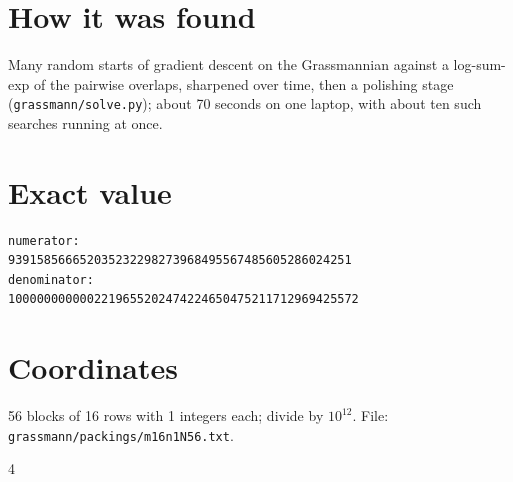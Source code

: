 \documentclass[11pt,a4paper]{article}
\begin{document}
\section{How it was found}
Many random starts of gradient descent on the Grassmannian against a log-sum-exp of the pairwise overlaps, sharpened over time, then a polishing stage (\texttt{grassmann/solve.py}); about 70 seconds on one laptop, with about ten such searches running at once.


\appendix
\section{Exact value}
{\small
\begin{verbatim}
numerator:
939158566652035232298273968495567485605286024251
denominator:
1000000000002219655202474224650475211712969425572
\end{verbatim}}

\section{Coordinates}
56 blocks of 16 rows with 1 integers each; divide by $10^{12}$. File: \texttt{grassmann/packings/m16n1N56.txt}.
{\tiny
\begin{multicols}{4}
\end{multicols}}
\end{document}
